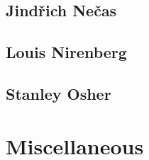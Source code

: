 \documentclass{article}
\begin{document}
\subsection{Jind\v{r}ich Ne\v{c}as}


\subsection{Louis Nirenberg}
\cite{Vazquez2020}


\subsection{Stanley Osher}


\section{Miscellaneous}


\printbibliography[heading=bibintoc]
	
\end{document}
